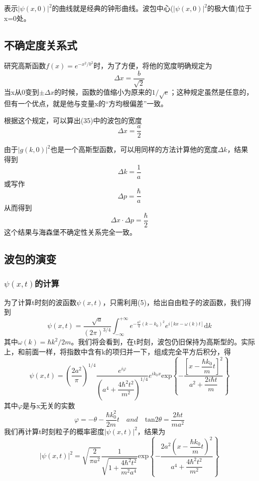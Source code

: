 \documentclass[]{article}
\begin{document}
表示$|\psi(x,0)|^2$的曲线就是经典的钟形曲线。波包中心($|\psi(x,0)|^2$的极大值)位于x=0处。
\subsection{不确定度关系式}
研究高斯函数$f(x)=e^{-x^2/b^2}$时，为了方便，将他的宽度明确规定为
\begin{equation}
	\Delta x=\dfrac{b}{\sqrt{2}}
\end{equation}
当x从0变到$\pm\Delta x$的时候，函数的值缩小为原来的$1/\sqrt{e}$；这种规定虽然是任意的，但有一个优点，就是他与变量x的“方均根偏差”一致。\par 
根据这个规定，可以算出(35)中的波包的宽度
\begin{equation}
	\Delta x=\dfrac{a}{2}
\end{equation}

由于$|g(k,0)|^2$也是一个高斯型函数，可以用同样的方法计算他的宽度$\Delta k$，结果得到
\begin{equation}
	\Delta k=\dfrac{1}{a}
\end{equation}
或写作
\begin{equation}
	\Delta p=\dfrac{\hbar}{a}
\end{equation}
从而得到
\begin{equation}
	\Delta x\cdot\Delta p=\dfrac{\hbar}{2}
\end{equation}
这个结果与海森堡不确定性关系完全一致。
\subsection{波包的演变}
\subsubsection{$\psi(x,t)$的计算}
为了计算t时刻的波函数$\psi(x,t)$，只需利用(5)，给出自由粒子的波函数，我们得到
\begin{equation}
	\psi(x,t)=\dfrac{\sqrt{a}}{(2\pi)^{3/4}}\int^{+\infty}_{-\infty}e^{-\frac{a^2}{4}(k-k_0)^2}e^{i[kx-\omega(k)t]}\mathrm{d}k
\end{equation}
其中$\omega(k)=\hbar k^2/2m$。我们将会看到，在t时刻，波包仍旧保持为高斯型的。实际上，和前面一样，将指数中含有k的项归并一下，组成完全平方后积分，得
\begin{equation}
	\psi(x,t)=\left( \dfrac{2a^2}{\pi}\right)^{1/4}\dfrac{e^{i\varphi}}{\left( a^4+\dfrac{4\hbar^2t^2}{m^2}\right) ^{1/4}}e^{ik_0x} \mathrm{exp}\left\lbrace -\dfrac{\left[ x-\dfrac{\hbar k_0}{m}t\right] ^2}{a^2+\dfrac{2i\hbar t}{m}}\right\rbrace 
\end{equation}
其中$\varphi$是与x无关的实数
\begin{equation}
	\varphi=-\theta-\dfrac{\hbar k^2_0}{2m}t\quad and \quad \mathrm{tan}2\theta=\dfrac{2\hbar t}{ma^2}
\end{equation}
我们再计算t时刻粒子的概率密度$|\psi(x,t)|^2$，结果为
\begin{equation}
	|\psi(x,t)|^2=\sqrt{\dfrac{2}{\pi a^2}}\dfrac{1}{\sqrt{1+\dfrac{4\hbar^2t^2}{m^2a^4}}}\mathrm{exp}\left\lbrace -\dfrac{2a^2\left( x-\dfrac{\hbar k_0}{m}t\right) ^2}{a^4+\dfrac{4\hbar^2 t^2}{m^2}}\right\rbrace  
\end{equation}
\end{document}

